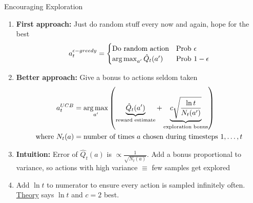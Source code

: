 \begin{frame}{Encouraging Exploration}
	\begin{enumerate}
		\item \textbf{First approach:} Just do random stuff every now and 
		again, hope for the best
		$$
		a^{\epsilon-greedy}_t = \begin{cases}
			\text{Do random action} & \text{Prob } \epsilon \\
			\operatorname*{arg\,max}_{a'} \hat{Q}_t(a') & \text{Prob } 1-\epsilon 
		\end{cases}
		$$
		\pause
		\item \textbf{Better approach:} Give a bonus to actions seldom taken
		\begin{align*}
		a^{UCB}_t &= \operatorname*{arg\,max}_{a'}
		\left( 
		\underbrace{\hat{Q}_t(a')}_{\text{reward estimate}} + \underbrace{c \sqrt{\frac{\ln t}{N_t(a')}}}_{\text{exploration bonus}}
		\right) \\
		\text{where } N_t(a) &= \text{number of times $a$ chosen during timesteps $1, \ldots, t$}
		\end{align*}
		\item \textbf{Intuition:} Error of
		$\hat{Q}_t(a)$ is  $\propto \frac{1}{\sqrt{N_t(a)}}$. Add a bonus proportional to variance,
		so actions with high variance $\equiv$ few samples get explored
		\item Add $\ln t$ to numerator to ensure every action is sampled
		infinitely often. \href{https://tor-lattimore.com/downloads/book/book.pdf}{Theory} says $\ln t$ and $c=2$ best.
	\end{enumerate}
	
\end{frame}


	

